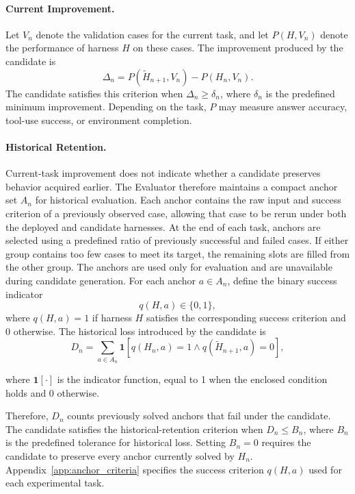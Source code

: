 \documentclass{article}
\begin{document}
\paragraph{Current Improvement.}
Let $V_n$ denote the validation cases for the current task, and let
$P(H,V_n)$ denote the performance of harness $H$ on these cases. The improvement
produced by the candidate is
\begin{equation}
\label{eq:evaluator_validation}
\Delta_n
=
P\left(\widetilde{H}_{n+1},V_n\right)
-
P\left(H_n,V_n\right).
\end{equation}
The candidate satisfies this criterion when
$\Delta_n \geq \delta_n$, where $\delta_n$ is the predefined minimum
improvement. Depending on the task, $P$ may measure answer accuracy, tool-use
success, or environment completion.

\paragraph{Historical Retention.}
Current-task improvement does not indicate whether a candidate preserves behavior acquired earlier. The Evaluator therefore maintains a compact anchor set $A_n$ for historical evaluation. Each anchor contains the raw input and success criterion of a previously observed case, allowing that case to be rerun under both the deployed and candidate harnesses. At the end of each task, anchors are selected using a predefined ratio of previously successful and failed cases. If either group contains too few cases to meet its target, the remaining slots are filled from the other group. The anchors are used only for evaluation and are unavailable during candidate generation. For each anchor $a\in A_n$, define the binary success indicator
\begin{equation}
\label{eq:anchor_success}
q(H,a)\in\{0,1\},
\end{equation}
where $q(H,a)=1$ if harness $H$ satisfies the corresponding success criterion and 0 otherwise.
The historical loss introduced by the candidate is
\begin{equation}
\label{eq:evaluator_historical_loss}
D_n
=
\sum_{a\in A_n}
\mathbf{1}
\left[
q(H_n,a)=1
\land
q\left(\widetilde{H}_{n+1},a\right)=0
\right],
\end{equation}

where $\mathbf{1}[\cdot]$ is the indicator function, equal to 1 when the enclosed condition holds and 0 otherwise.

Therefore, $D_n$ counts previously solved anchors that fail under the candidate.
The candidate satisfies the historical-retention criterion when $D_n \leq B_n$, where $B_n$ is the predefined tolerance for historical loss.
Setting $B_n=0$ requires the candidate to preserve every anchor currently solved by $H_n$. Appendix~\ref{app:anchor_criteria} specifies the success criterion $q(H,a)$ used for each experimental task.
\end{document}
